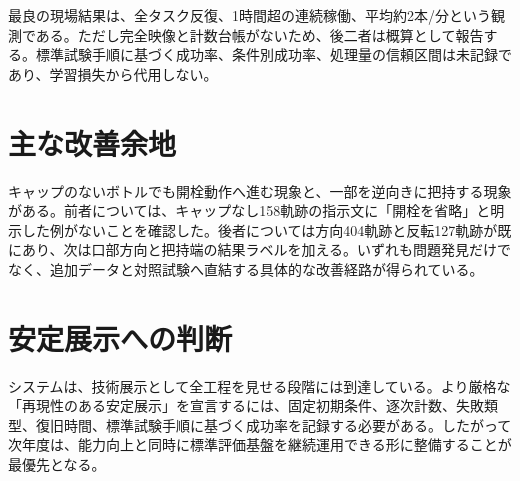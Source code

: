 最良の現場結果は、全タスク反復、1時間超の連続稼働、平均約2本/分という観測である。ただし完全映像と計数台帳がないため、後二者は概算として報告する。標準試験手順に基づく成功率、条件別成功率、処理量の信頼区間は未記録であり、学習損失から代用しない。


\section{主な改善余地}

キャップのないボトルでも開栓動作へ進む現象と、一部を逆向きに把持する現象がある。前者については、キャップなし158軌跡の指示文に「開栓を省略」と明示した例がないことを確認した。後者については方向404軌跡と反転127軌跡が既にあり、次は口部方向と把持端の結果ラベルを加える。いずれも問題発見だけでなく、追加データと対照試験へ直結する具体的な改善経路が得られている。

\section{安定展示への判断}

システムは、技術展示として全工程を見せる段階には到達している。より厳格な「再現性のある安定展示」を宣言するには、固定初期条件、逐次計数、失敗類型、復旧時間、標準試験手順に基づく成功率を記録する必要がある。したがって次年度は、能力向上と同時に標準評価基盤を継続運用できる形に整備することが最優先となる。
